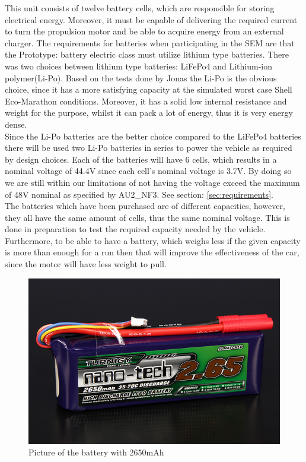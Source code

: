 This unit consists of twelve battery cells, which are responsible for storing electrical energy. Moreover, it must be capable of delivering the required current to turn the propulsion motor and be able to acquire energy from an external charger.   
The requirements for batteries when participating in the SEM are that the Prototype: battery electric class must utilize lithium type batteries. There was two choices between lithium type batteries: LiFePo4 and Lithium-ion polymer(Li-Po). Based on the tests done by Jonas \cite{BMSBatteryTest} the Li-Po is the obvious choice, since it has a more satisfying capacity at the simulated worst case Shell Eco-Marathon conditions. Moreover, it has a solid low internal resistance and weight for the purpose, whilst it can pack a lot of energy, thus it is very energy dense. \\
Since the Li-Po batteries are the better choice compared to the LiFePo4 batteries there will be used two Li-Po batteries in series to power the vehicle as required by design choices. Each of the batteries will have 6 cells, which results in a nominal voltage of 44.4V since each cell's nominal voltage is 3.7V. By doing so we are still within our limitations of not having the voltage exceed the maximum of 48V nominal as specified by AU2\_NF3. See section: \vref{sec:requirements}.\\
The batteries which have been purchased are of different capacities, however, they all have the same amount of cells, thus the same nominal voltage. This is done in preparation to test the required capacity needed by the vehicle. Furthermore, to be able to have a battery, which weighs less if the given capacity is more than enough for a run then that will improve the effectiveness of the car, since the motor will have less weight to pull.\\

\begin{figure}[H]
	\centering
	\includegraphics[width=0.6\linewidth]{Hardware/Pictures/2650battery}
	\caption[Empty]{Picture of the battery with 2650mAh\footnotemark}
	\label{fig:2650battery}
\end{figure}

